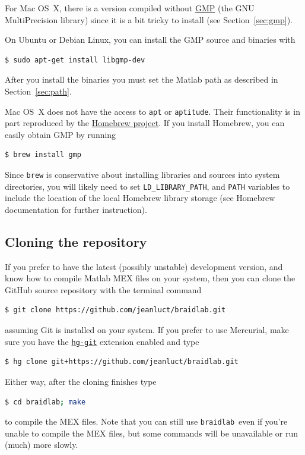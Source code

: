 \documentclass[12pt]{article}
\newcommand{\braidlab}{\texttt{braidlab}}%
\begin{document}
For Mac OS~X, there is a version compiled without
\href{https://gmplib.org/}{GMP} (the GNU MultiPrecision library) %
%
since it is a bit tricky to install (see Section~\ref{sec:gmp}).

On Ubuntu or Debian Linux, you can install the GMP source and binaries with
\begin{lstlisting}[frame=single,framerule=0pt,escapechar=*,%
  language=bash,backgroundcolor=\color{white}]
$ sudo apt-get install libgmp-dev
\end{lstlisting}
After you install the binaries you must set the Matlab path as described in
Section~\ref{sec:path}.

%
Mac OS~X does not have the access to \lstinline{apt} or
\lstinline{aptitude}. Their functionality is in part reproduced by the %
%
\href{http://brew.sh/}{Homebrew project}. If you install Homebrew, you can
easily obtain GMP by running
\begin{lstlisting}[frame=single,framerule=0pt,escapechar=*,%
  language=bash,backgroundcolor=\color{white}]
$ brew install gmp
\end{lstlisting}
Since \lstinline{brew} is conservative about installing libraries and
sources into system directories, you will likely need to set
\lstinline{LD_LIBRARY_PATH}, and \lstinline{PATH} variables to include
the location of the local Homebrew library storage (see Homebrew
documentation for further instruction).

%


\subsection{Cloning the repository}
\label{sec:cloning}

 If you prefer to have the latest (possibly unstable) development
version, and know how to compile Matlab MEX %
 files on your system, then you can clone the GitHub
source repository with the terminal command
\begin{lstlisting}[frame=single,framerule=0pt,escapechar=*,%
  language=bash,backgroundcolor=\color{white}]
$ git clone https://github.com/jeanluct/braidlab.git
\end{lstlisting}
assuming Git is installed on your system.  If you prefer to use
Mercurial, make sure you have the
\href{http://hg-git.github.io/}{\lstinline{hg-git}} extension enabled and type
\begin{lstlisting}[frame=single,framerule=0pt,escapechar=*,%
  language=bash,backgroundcolor=\color{white}]
$ hg clone git+https://github.com/jeanluct/braidlab.git
\end{lstlisting}
Either way, after the cloning finishes type
\begin{lstlisting}[frame=single,framerule=0pt,escapechar=*,%
  language=bash,backgroundcolor=\color{white}]
$ cd braidlab; make
\end{lstlisting}
to compile the MEX files.  Note that you can still use \braidlab\ even if
you're unable to compile the MEX files, but some commands will be unavailable
or run (much) more slowly.
\end{document}
